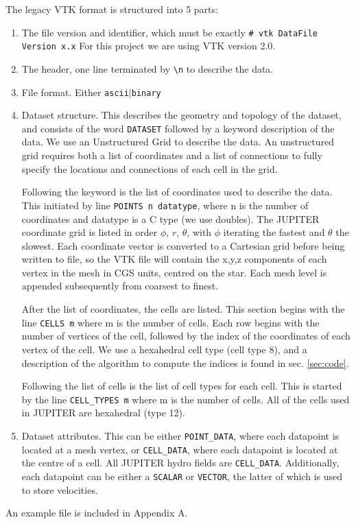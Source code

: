 \documentclass[twocolumn]{aastex62}
\begin{document}
The legacy VTK format is structured into 5 parts:
\begin{enumerate}
	\item The file version and identifier, which must be exactly \verb|# vtk DataFile Version x.x|
	For this project we are using VTK version 2.0.
	\item The header, one line terminated by \verb|\n| to describe the data.
	\item File format. Either \verb|ascii|$\lvert$\verb|binary|
	\item Dataset structure. This describes the geometry and topology of the dataset, and consists of the word \verb|DATASET| followed by a keyword description of the data. We use an Unstructured Grid to describe the data.
	An unstructured grid requires both a list of coordinates and a list of connections to fully specify the locations and connections of each cell in the grid.
	
	Following the keyword is the list of coordinates used to describe the data. This initiated by line \verb|POINTS n datatype|, where n is the number of coordinates and datatype is a C type (we use doubles). The JUPITER coordinate grid is listed in order $\phi$, $r$, $\theta$, with $\phi$ iterating the fastest and $\theta$ the slowest. Each coordinate vector is converted to a Cartesian grid before being written to file, so the VTK file will contain the x,y,z components of each vertex in the mesh in CGS units, centred on the star. Each mesh level is appended subsequently from coarsest to finest.
	
	After the list of coordinates, the cells are listed. This section begins with the line \verb|CELLS m| where m is the number of cells. Each row begins with the number of vertices of the cell, followed by the index of the coordinates of each vertex of the cell. We use a hexahedral cell type (cell type 8), and a description of the algorithm to compute the indices is found in sec. \ref{sec:code}. 
	
	Following the list of cells is the list of cell types for each cell. This is started by the line \verb|CELL_TYPES m| where m is the number of cells. All of the cells used in JUPITER are hexahedral (type 12).
	\item Dataset attributes. This can be either \verb|POINT_DATA|, where each datapoint is located at a mesh vertex, or \verb|CELL_DATA|, where each datapoint is located at the centre of a cell. All JUPITER hydro fields are \verb|CELL_DATA|. Additionally, each datapoint can be either a \verb|SCALAR| or \verb|VECTOR|, the latter of which is used to store velocities.
\end{enumerate}
An example file is included in Appendix A.
\end{document}
